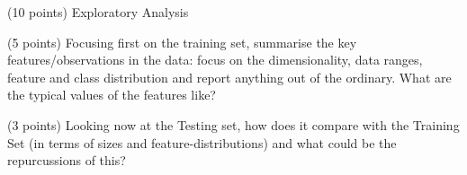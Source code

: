 \documentclass[12pt]{article}
\begin{document}
\maketitle
\thispagestyle{empty}









\begin{question}{(10 points) Exploratory Analysis}




\begin{subquestion}{(5 points) Focusing first on the training set, summarise the key features/observations in the data: focus on the dimensionality, data ranges, feature and class distribution and report anything out of the ordinary. What are the typical values of the features like?}





\end{subquestion}


\begin{subquestion}{(3 points) Looking now at the Testing set, how does it compare with the Training Set (in terms of sizes and feature-distributions) and what could be the repurcussions of this?}



\end{subquestion}
\end{question}
\end{document}
